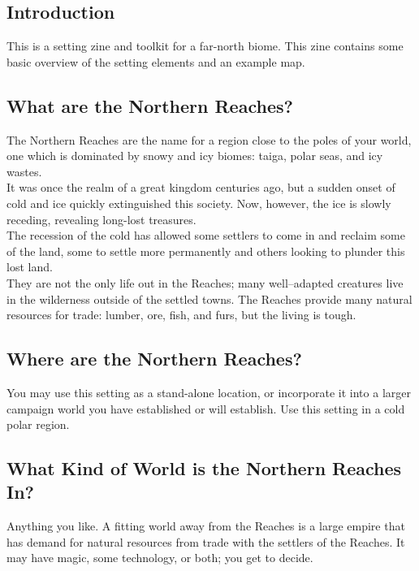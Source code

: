 \documentclass[notitlepage]{article}
\begin{document}
\begin{multicols}{2}
  
\section{Introduction}

This is a setting zine and toolkit for a far-north biome. This zine contains some basic overview of the setting elements and an example map.

\subsection*{What are the Northern Reaches?}

The Northern Reaches are the name for a region close to the poles of your world, one which is dominated by snowy and icy biomes: taiga, polar seas, and icy wastes. \\

It was once the realm of a great kingdom centuries ago, but a sudden onset of cold and ice quickly extinguished this society.
Now, however, the ice is slowly receding, revealing long-lost treasures. \\

The recession of the cold has allowed some settlers to come in and reclaim some of the land, some to settle more permanently and others looking to plunder this lost land. \\

They are not the only life out in the Reaches; many well--adapted creatures live in the wilderness outside of the settled towns.
The Reaches provide many natural resources for trade: lumber, ore, fish, and furs, but the living is tough.

\subsection*{Where are the Northern Reaches?}

You may use this setting as a stand-alone location, or incorporate it into a larger campaign world you have established or will establish.
Use this setting in a cold polar region.

\subsection*{What Kind of World is the Northern Reaches In?}

Anything you like.
A fitting world away from the Reaches is a large empire that has demand for natural resources from trade with the settlers of the Reaches.
It may have magic, some technology, or both; you get to decide. \\


\end{multicols}
\end{document}
